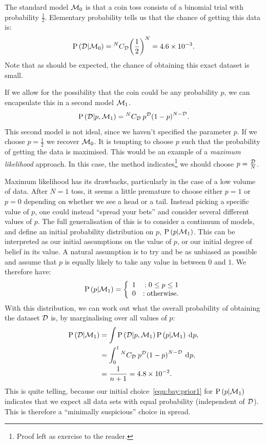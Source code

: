 The standard model $\mathcal{M}_0$ is that a coin toss consists of a binomial trial with probability $\frac{1}{2}$. Elementary probability tells us that the chance of getting this data is:
\begin{equation}
  \mathrm{P}\left(\mathcal{D}\middle|\mathcal{M}_0\right)= {^{N}C_{\mathcal{D}}} {\left( \frac{1}{2} \right)}^{N}  = 4.6\times 10^{-3}.
  \label{eqn:bay:M0}
\end{equation}
Note that as should be expected, the chance of obtaining this exact dataset is small. 

If we allow for the possibility that the coin could be any probability $p$, we can encapsulate this in a second model $\mathcal{M}_1$.
\begin{equation}
  \mathrm{P}\left(\mathcal{D}\middle|p,\mathcal{M}_1\right)= {^{N}C_{\mathcal{D}}}\: {p}^{\mathcal{D}} {\left(1 - p \right)}^{N-\mathcal{D}}.
  \label{eqn:bay:M1}
\end{equation}
This second model is not ideal, since we haven't specified the parameter $p$. If we choose $p=\frac{1}{2}$ we recover $\mathcal{M}_0$. It is tempting to choose $p$ such that the probability of getting the data is maximised. This would be an example of a {\em maximum likelihood\/} approach. In this case, the method indicates\footnote{Proof left as exercise to the reader.} we should choose $p = \frac{\mathcal{D}}{N}$. 

Maximum likelihood has its drawbacks, particularly in the case of a low volume of data. After $N=1$ toss, it seems a little premature to choose either $p=1$ or $p=0$ depending on whether we see a head or a tail. Instead picking a specific value of $p$, one could instead ``spread your bets'' and consider several different values of $p$. The full generalisation of this is to consider a continuum of models, and define an initial probability distribution on $p$, $\mathrm{P}\left(p\middle|\mathcal{M}_1\right)$. This can be interpreted as our initial assumptions on the value of $p$, or our initial degree of belief in its value.
A natural assumption is to try and be as unbiased as possible and assume that $p$ is equally likely to take any value in between $0$ and $1$. We therefore have:
\begin{equation}
  \mathrm{P}\left(p\middle|\mathcal{M}_1\right)=\left\{
  \begin{array}{lr}
    1 &:0\le p\le1\\
    0 &:\text{otherwise.}\\
  \end{array}
  \right.\label{eqn:bay:prior1}
\end{equation}
With this distribution, we can work out what the overall probability of obtaining the dataset $\mathcal{D}$ is, by marginalising over all values of $p$:
\begin{align}
  \mathrm{P}\left(\mathcal{D}\middle|\mathcal{M}_1\right) 
  &= \int \mathrm{P}\left(\mathcal{D}\middle|p,\mathcal{M}_1\right)\mathrm{P}\left(p\middle|\mathcal{M}_1\right)\: \operatorname{d}^{}\!{p}, \\
  &= \int_0^1 {^{N}C_{\mathcal{D}}}\: {p}^{\mathcal{D}} {\left(1 - p \right)}^{N-\mathcal{D}}\: \operatorname{d}^{}\!{p}, \\
  &= \frac{1}{n+1} = 4.8\times10^{-2}.
  \label{eqn:bay:marg}
\end{align}
This is quite telling, because our initial choice~\eqref{eqn:bay:prior1} for $\mathrm{P}\left(p\middle|\mathcal{M}_1\right)$ indicates that we expect all data sets with equal probability (independent of $\mathcal{D}$). This is therefore a ``minimally suspicious'' choice in spread.

